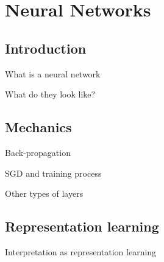 
\section{Neural Networks}
\subsection{Introduction}
\begin{frame}{What is a neural network}

\end{frame}
\begin{frame}{What do they look like?}

\end{frame}
\subsection{Mechanics}
\begin{frame}{Back-propagation}

\end{frame}
\begin{frame}{SGD and training process}

\end{frame}
\begin{frame}{Other types of layers}

\end{frame}
\subsection{Representation learning}
\begin{frame}{Interpretation as representation learning}

\end{frame}
